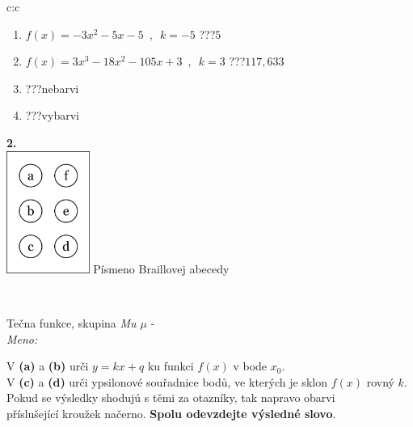 \documentclass[10pt]{report}
\begin{document}
\begin{tabular}{c:c}
\begin{minipage}[c][104.5mm][t]{0.5\linewidth}
\begin{center}
\begin{minipage}{0.79\linewidth}
\begin{center}
\begin{varwidth}{\linewidth}
\begin{enumerate}
\item $f(x)=-3x^2-5x-5\enspace , \enspace k=-5$\quad \dotfill\; ???\;\dotfill \quad $5$
\item $f(x)=3x^3-18x^2-105x+3\enspace , \enspace k=3$\quad \dotfill\; ???\;\dotfill \quad $117 , 633$
\item \quad \dotfill\; ???\;\dotfill \quad nebarvi
\item \quad \dotfill\; ???\;\dotfill \quad vybarvi
\end{enumerate}
\end{varwidth}
\end{center}
\end{minipage}
\begin{minipage}{0.20\linewidth}
\begin{center}
{\Huge\bfseries 2.} \\[2mm]
\includegraphics[height=40mm]{../images/braille.png}
{\small Písmeno Braillovej abecedy}
\end{center}
\end{minipage}
\end{center}
\end{minipage}
\\ \hdashline
\begin{minipage}[c][104.5mm][t]{0.5\linewidth}
\begin{center}
\vspace{7mm}
{\huge Tečna funkce, skupina \textit{Mu $\mu$} -}\\[5mm]
\textit{Meno:}\phantom{xxxxxxxxxxxxxxxxxxxxxxxxxxxxxxxxxxxxxxxxxxxxxxxxxxxxxxxxxxxxxxxxx}\\[5mm]
\begin{minipage}{0.95\linewidth}
\begin{center}
V \textbf{(a)} a \textbf{(b)} urči  $y = kx + q$ ku funkci $f(x)$ v bode $x_0$.\\V \textbf{(c)} a \textbf{(d)} urči ypsilonové souřadnice bodů, ve kterých je sklon $f(x)$ rovný $k$.\\Pokud se výsledky shodujú s těmi za otazníky, tak napravo obarvi\\příslušející kroužek načerno. \textbf{Spolu odevzdejte výsledné slovo}.

\end{center}
\end{minipage}
\end{center}
\end{minipage}
\end{tabular}
\end{document}
